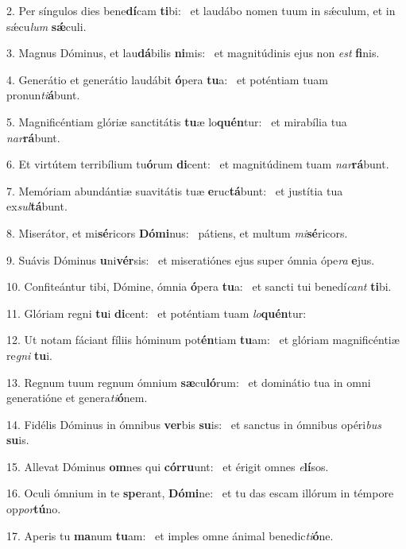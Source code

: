 2. Per síngulos dies bene\textbf{dí}cam \textbf{ti}bi: \ast\  et laudábo nomen tuum in sǽculum, et in sǽcu\textit{lum} \textbf{sǽ}culi.\

3. Magnus Dóminus, et lau\textbf{dá}bilis \textbf{ni}mis: \ast\  et magnitúdinis ejus non \textit{est} \textbf{fi}nis.\

4. Generátio et generátio laudábit \textbf{ó}pera \textbf{tu}a: \ast\  et poténtiam tuam pronun\textit{ti}\textbf{á}bunt.\

5. Magnificéntiam glóriæ sanctitátis \textbf{tu}æ lo\textbf{quén}tur: \ast\  et mirabília tua \textit{nar}\textbf{rá}bunt.\

6. Et virtútem terribílium tu\textbf{ó}rum \textbf{di}cent: \ast\  et magnitúdinem tuam \textit{nar}\textbf{rá}bunt.\

7. Memóriam abundántiæ suavitátis tuæ \textbf{e}ruc\textbf{tá}bunt: \ast\  et justítia tua ex\textit{sul}\textbf{tá}bunt.\

8. Miserátor, et mi\textbf{sé}ricors \textbf{Dó}\textbf{mi}nus: \ast\  pátiens, et multum \textit{mi}\textbf{sé}ricors.\

9. Suávis Dóminus \textbf{u}ni\textbf{vér}sis: \ast\  et miseratiónes ejus super ómnia ópe\textit{ra} \textbf{e}jus.\

10. Confiteántur tibi, Dómine, ómnia \textbf{ó}pera \textbf{tu}a: \ast\  et sancti tui benedí\textit{cant} \textbf{ti}bi.\

11. Glóriam regni \textbf{tu}i \textbf{di}cent: \ast\  et poténtiam tuam \textit{lo}\textbf{quén}tur:\

12. Ut notam fáciant fíliis hóminum pot\textbf{én}tiam \textbf{tu}am: \ast\  et glóriam magnificéntiæ re\textit{gni} \textbf{tu}i.\

13. Regnum tuum regnum ómnium \textbf{sæ}cu\textbf{ló}rum: \ast\  et dominátio tua in omni generatióne et genera\textit{ti}\textbf{ó}nem.\

14. Fidélis Dóminus in ómnibus \textbf{ver}bis \textbf{su}is: \ast\  et sanctus in ómnibus opéri\textit{bus} \textbf{su}is.\

15. Allevat Dóminus \textbf{om}nes qui \textbf{cór}\textbf{ru}unt: \ast\  et érigit omnes \textit{e}\textbf{lí}sos.\

16. Oculi ómnium in te \textbf{spe}rant, \textbf{Dó}\textbf{mi}ne: \ast\  et tu das escam illórum in témpore op\textit{por}\textbf{tú}no.\

17. Aperis tu \textbf{ma}num \textbf{tu}am: \ast\  et imples omne ánimal benedic\textit{ti}\textbf{ó}ne.\

